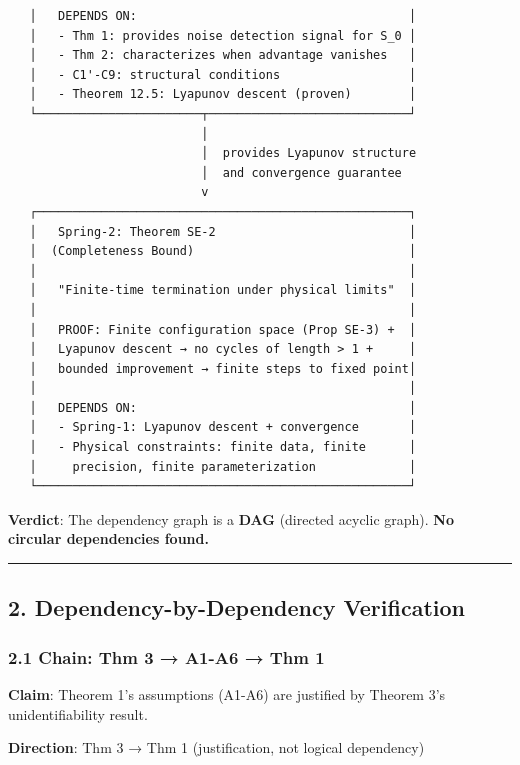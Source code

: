 \documentclass[
  12pt,
]{article}
\begin{document}
\begin{verbatim}
   │   DEPENDS ON:                                      │
   │   - Thm 1: provides noise detection signal for S_0 │
   │   - Thm 2: characterizes when advantage vanishes   │
   │   - C1'-C9: structural conditions                  │
   │   - Theorem 12.5: Lyapunov descent (proven)        │
   └───────────────────────┬────────────────────────────┘
                           │
                           │  provides Lyapunov structure
                           │  and convergence guarantee
                           v
   ┌────────────────────────────────────────────────────┐
   │   Spring-2: Theorem SE-2                           │
   │  (Completeness Bound)                              │
   │                                                    │
   │   "Finite-time termination under physical limits"  │
   │                                                    │
   │   PROOF: Finite configuration space (Prop SE-3) +  │
   │   Lyapunov descent → no cycles of length > 1 +     │
   │   bounded improvement → finite steps to fixed point│
   │                                                    │
   │   DEPENDS ON:                                      │
   │   - Spring-1: Lyapunov descent + convergence       │
   │   - Physical constraints: finite data, finite      │
   │     precision, finite parameterization             │
   └────────────────────────────────────────────────────┘
\end{verbatim}

\textbf{Verdict}: The dependency graph is a \textbf{DAG} (directed
acyclic graph). \textbf{No circular dependencies found.}

\begin{center}\rule{0.5\linewidth}{0.5pt}\end{center}

\subsection{2. Dependency-by-Dependency
Verification}\label{dependency-by-dependency-verification}

\subsubsection{2.1 Chain: Thm 3 → A1-A6 → Thm
1}\label{chain-thm-3-a1-a6-thm-1}

\textbf{Claim}: Theorem 1's assumptions (A1-A6) are justified by Theorem
3's unidentifiability result.

\textbf{Direction}: Thm 3 → Thm 1 (justification, not logical
dependency)
\end{document}
